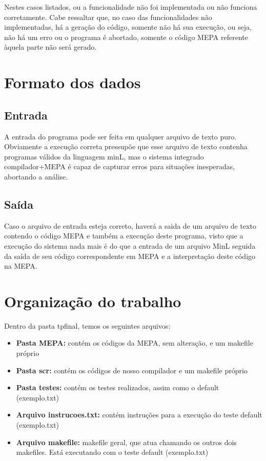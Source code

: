\documentclass[a4paper,12pt]{article}
\begin{document}
Nestes casos listados, ou a funcionalidade não foi implementada ou não funciona corretamente. Cabe ressaltar que, no caso das funcionalidades não implementadas, há a geração do código, somente não há sua execução, ou seja, não há um erro ou o programa é abortado, somente o código MEPA referente àquela parte não será gerado.

\section{Formato dos dados}
\subsection{Entrada}
A entrada do programa pode ser feita em qualquer arquivo de texto puro. Obviamente a execução correta pressupõe que esse arquivo de texto contenha programas válidos da linguagem minL, mas o sistema integrado compilador+MEPA é capaz de capturar erros para situações inesperadas, abortando a análise.

\subsection{Saída}
Caso o arquivo de entrada esteja correto, haverá a saida de um arquivo de texto contendo o código MEPA e também a execução deste programa, visto que a execução do sistema nada mais é do que a entrada de um arquivo MinL seguida da saída de seu código correspondente em MEPA e a interpretação deste código na MEPA.

\section{Organização do trabalho}
Dentro da pasta tpfinal, temos os seguintes arquivos:
\begin{itemize}
 \item \textbf{Pasta MEPA:} contém os códigos da MEPA, sem alteração, e um makefile próprio
 \item \textbf{Pasta scr:} contém os códigos de nosso compilador e um makefile próprio
 \item \textbf{Pasta testes:} contém os testes realizados, assim como o default (exemplo.txt)
\item \textbf{Arquivo instrucoes.txt:} contém instruções para a execução do teste default (exemplo.txt)
\item \textbf{Arquivo makefile:} makefile geral, que atua chamando os outros dois makefiles. Está executando com o teste default (exemplo.txt)
\end{itemize}
\end{document}

